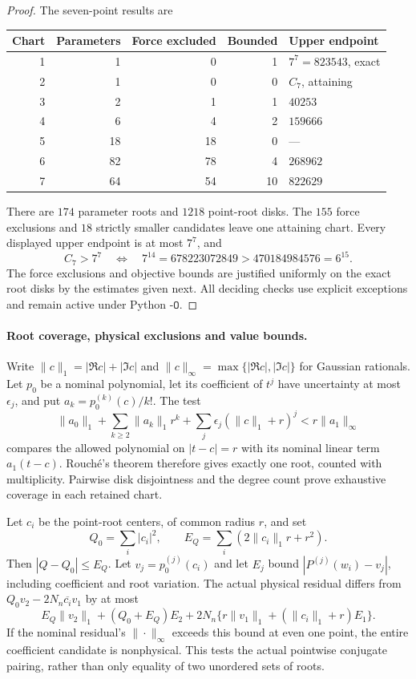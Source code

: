 \documentclass[11pt]{article}
\theoremstyle{remark}
\numberwithin{equation}{section}
\begin{document}
\begin{proof}
The seven-point results are
\begin{center}
\begin{tabular}{rrrrl}
\toprule
Chart&Parameters&Force excluded&Bounded&Upper endpoint\\
\midrule
1&1&0&1&$7^7=823543$, exact\\
2&1&0&0&$C_7$, attaining\\
3&2&1&1&$40253$\\
4&6&4&2&$159666$\\
5&18&18&0&---\\
6&82&78&4&$268962$\\
7&64&54&10&$822629$\\
\bottomrule
\end{tabular}
\end{center}
There are $174$ parameter roots and $1218$ point-root disks.
The $155$ force exclusions and $18$ strictly smaller candidates leave
one attaining chart. Every displayed upper endpoint is at most $7^7$,
and
\[
 C_7>7^7\quad\Longleftrightarrow\quad
 7^{14}=678223072849>470184984576=6^{15}.
\]
The force exclusions and objective bounds are justified uniformly on
the exact root disks by the estimates given next. All deciding checks
use explicit exceptions and remain active under Python $\texttt{-O}$.
\end{proof}

\paragraph{Root coverage, physical exclusions and value bounds.}
Write $\|c\|_1=|\Re c|+|\Im c|$ and
$\|c\|_\infty=\max\{|\Re c|,|\Im c|\}$ for Gaussian rationals.
Let $p_0$ be a nominal polynomial, let its coefficient of $t^j$ have
uncertainty at most $\epsilon_j$, and put
$a_k=p_0^{(k)}(c)/k!$. The test
\[
 \|a_0\|_1+\sum_{k\ge2}\|a_k\|_1r^k
       +\sum_j\epsilon_j(\|c\|_1+r)^j
 <r\|a_1\|_\infty
\]
compares the allowed polynomial on $|t-c|=r$ with its nominal
linear term $a_1(t-c)$. Rouch\'e's theorem therefore gives exactly
one root, counted with multiplicity. Pairwise disk disjointness and
the degree count prove exhaustive coverage in each retained chart.

Let $c_i$ be the point-root centers, of common radius $r$, and set
\[
 Q_0=\sum_i|c_i|^2,\qquad
 E_Q=\sum_i(2\|c_i\|_1r+r^2).
\]
Then $|Q-Q_0|\le E_Q$. Let $v_j=p_0^{(j)}(c_i)$ and let $E_j$
bound $|P^{(j)}(w_i)-v_j|$, including coefficient and root variation.
The actual physical residual differs from
$Q_0v_2-2N_n\overline{c_i}v_1$ by at most
\[
 E_Q\|v_2\|_1+(Q_0+E_Q)E_2
 +2N_n\{r\|v_1\|_1+(\|c_i\|_1+r)E_1\}.
\]
If the nominal residual's $\|\cdot\|_\infty$ exceeds this bound
at even one point, the entire coefficient candidate is nonphysical.
This tests the actual pointwise conjugate pairing, rather than only
equality of two unordered sets of roots.
\end{document}
